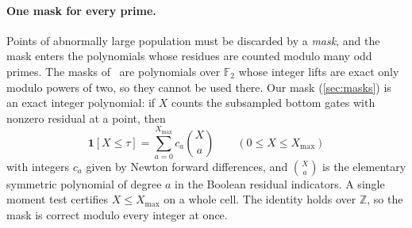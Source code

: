 \documentclass[11pt,letterpaper]{article}
\theoremstyle{definition}
\theoremstyle{remark}
\newcommand{\F}{\mathbb F}
\newcommand{\Z}{\mathbb Z}
\newcommand{\ind}{\mathbf 1}
\newcommand{\Xmax}{X_{\max}}
\begin{document}
\paragraph{One mask for every prime.}
Points of abnormally large population must be discarded by a
\emph{mask}, and the mask enters the polynomials whose residues are
counted modulo many odd primes. The masks of~\cite{Nag72}
are polynomials over \(\F_2\) whose integer lifts are exact only modulo
powers of two, so they cannot be used there. Our mask (\cref{sec:masks}) is an exact
integer polynomial: if \(X\) counts the subsampled bottom gates with
nonzero residual at a point, then
\[
 \ind[X\le\tau]=\sum_{a=0}^{\Xmax}c_a\binom Xa
 \qquad(0\le X\le\Xmax)
\]
with integers \(c_a\) given by Newton forward differences, and
\(\binom Xa\) is the elementary symmetric polynomial of degree \(a\)
in the Boolean residual indicators. A single moment test certifies
\(X\le\Xmax\) on a whole cell. The identity holds over \(\Z\), so the
mask is correct modulo every integer at once.
\end{document}
